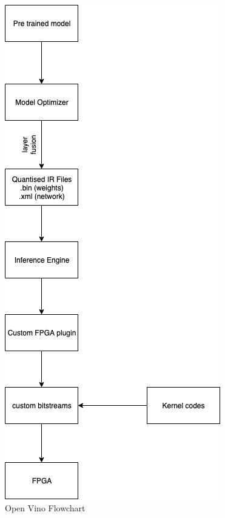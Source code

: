 \documentclass[titlepage]{report}
\begin{document}
\begin{figure}[h!]
    \centering
    \includegraphics[scale=0.65]{open_vino_flowchart.jpg}
    \caption{Open Vino Flowchart}
\end{figure}
\end{document}
